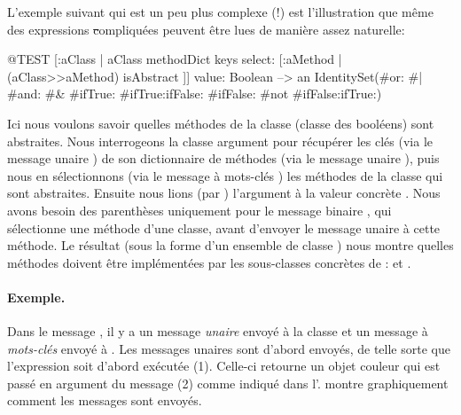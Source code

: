 \documentclass[a4paper,10pt,twoside]{book}
\begin{document}
L'exemple suivant qui est un peu plus complexe (!) est l'illustration que m\^eme des expressions \st compliqu\'ees peuvent \^etre lues de mani\`ere assez naturelle: 
\begin{code}{@TEST}
[:aClass | aClass methodDict keys select: [:aMethod | (aClass>>aMethod) isAbstract ]] value: Boolean --> an IdentitySet(#or: #| #and: #& #ifTrue: #ifTrue:ifFalse: #ifFalse: #not #ifFalse:ifTrue:)
\end{code}
\noindent
Ici nous voulons savoir quelles m\'ethodes de la classe 
(classe des bool\'eens) sont abstraites.
Nous interrogeons la classe argument  pour r\'ecup\'erer
les cl\'es (via le message unaire ) de son dictionnaire de
m\'ethodes (via le message unaire ), puis nous en
s\'electionnons (via le message \`a mots-cl\'es ) les
m\'ethodes de la classe qui sont abstraites.
Ensuite nous lions (par ) l'argument  \`a la
valeur concr\`ete .
Nous avons besoin des parenth\`eses uniquement pour le message binaire
\ct{>>}, qui s\'electionne une m\'ethode d'une classe, avant d'envoyer
le message unaire \mbox{} \`a cette m\'ethode. Le
r\'esultat (sous la forme d'un ensemble de classe )
nous montre quelles m\'ethodes doivent \^etre impl\'ement\'ees par les
sous-classes concr\`etes de :  et .



\paragraph{Exemple.}
Dans le message , il y a un message \emph{unaire}  envoy\'e \`a la classe  et un message \`a \emph{mots-cl\'es}  envoy\'e \`a . Les messages unaires sont d'abord envoy\'es, de telle sorte que l'expression  soit d'abord ex\'ecut\'ee (1). Celle-ci retourne un objet couleur qui est pass\'e en argument du message  (2) comme indiqu\'e dans l'.
 montre graphiquement comment les messages sont envoy\'es.
\end{document}
